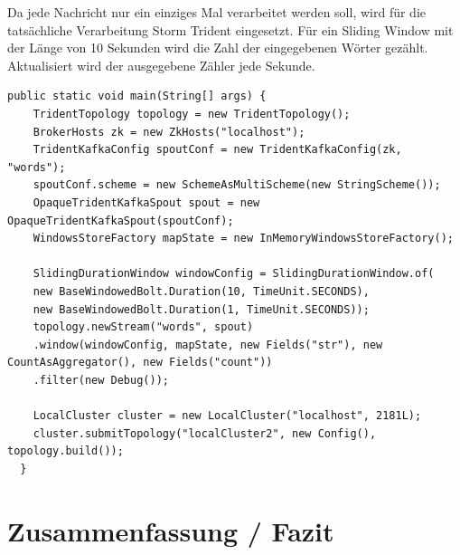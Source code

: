 \documentclass[a4paper,11pt]{scrartcl}
\begin{document}

  Da jede Nachricht nur ein einziges Mal verarbeitet werden soll, wird
  für die tatsächliche Verarbeitung Storm Trident eingesetzt. Für ein
  Sliding Window mit der Länge von 10 Sekunden wird die Zahl der
  eingegebenen Wörter gezählt. Aktualisiert wird der ausgegebene
  Zähler jede Sekunde.

  \begin{lstlisting}[caption={Beispielimplementierung zur Ermittlung der Tippgeschwindigkeit}]
  public static void main(String[] args) {
    TridentTopology topology = new TridentTopology();
    BrokerHosts zk = new ZkHosts("localhost");
    TridentKafkaConfig spoutConf = new TridentKafkaConfig(zk, "words");
    spoutConf.scheme = new SchemeAsMultiScheme(new StringScheme());
    OpaqueTridentKafkaSpout spout = new OpaqueTridentKafkaSpout(spoutConf);
    WindowsStoreFactory mapState = new InMemoryWindowsStoreFactory();

    SlidingDurationWindow windowConfig = SlidingDurationWindow.of(
    new BaseWindowedBolt.Duration(10, TimeUnit.SECONDS),
    new BaseWindowedBolt.Duration(1, TimeUnit.SECONDS));
    topology.newStream("words", spout)
    .window(windowConfig, mapState, new Fields("str"), new CountAsAggregator(), new Fields("count"))
    .filter(new Debug());

    LocalCluster cluster = new LocalCluster("localhost", 2181L);
    cluster.submitTopology("localCluster2", new Config(), topology.build());
  }
  \end{lstlisting}


  \section{Zusammenfassung / Fazit}
  
  


  
\end{document}
